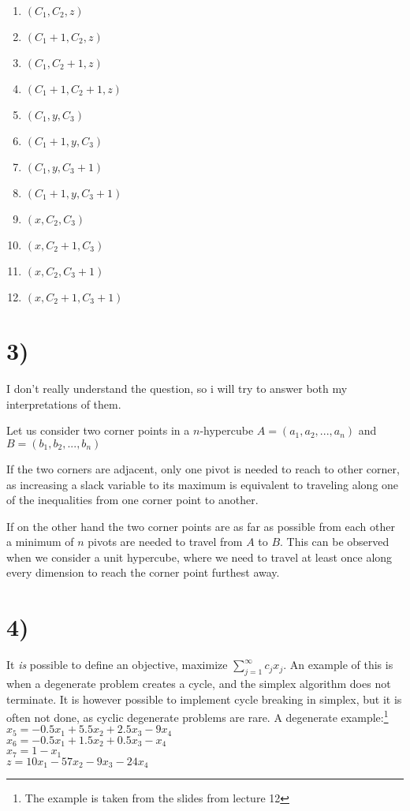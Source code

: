 \begin{enumerate}
\itemsep-1.5em 
\item $(C_1, C_2, z)$ \\
\item $(C_1+1, C_2, z)$ \\
\item $(C_1, C_2+1, z)$ \\
\item $(C_1+1, C_2+1, z)$ \\
\item $(C_1, y, C_3)$ \\
\item $(C_1+1, y, C_3)$ \\
\item $(C_1, y, C_3+1)$ \\
\item $(C_1+1, y, C_3+1)$ \\
\item $(x, C_2, C_3)$ \\
\item $(x, C_2+1, C_3)$ \\
\item $(x, C_2, C_3+1)$ \\
\item $(x, C_2+1, C_3+1)$ \\
\end{enumerate}

\section*{3)}
I don't really understand the question, so i will try to answer both my interpretations of them.

Let us consider two corner points in a $n$-hypercube $A=(a_1, a_2, ..., a_n)$ and $B=(b_1, b_2, ..., b_n)$

If the two corners are adjacent, only one pivot is needed to reach to other corner, as increasing a slack variable to its maximum is equivalent to traveling along one of the inequalities from one corner point to another.

If on the other hand the two corner points are as far as possible from each other a minimum of $n$ pivots are needed to travel from $A$ to $B$. This can be observed when we consider a unit hypercube, where we need to travel at least once along every dimension to reach the corner point furthest away.

\section*{4)}
It \textit{is} possible to define an objective, maximize $\sum_{j=1}^{\infty} c_j x_j$. An example of this is when a degenerate problem creates a cycle, and the simplex algorithm does not terminate. It is however possible to implement cycle breaking in simplex, but it is often not done, as cyclic degenerate problems are rare. A degenerate example:\footnote{The example is taken from the slides from lecture 12}\\

\noindent
$x_5 = -0.5x_1 + 5.5x_2 + 2.5x_3 - 9x_4$\\ 
$x_6 = -0.5x_1 + 1.5x_2 + 0.5x_3 - x_4$\\
$x_7 = 1 - x_1$\\
$z = 10x_1 - 57x_2 - 9x_3 - 24x_4$


